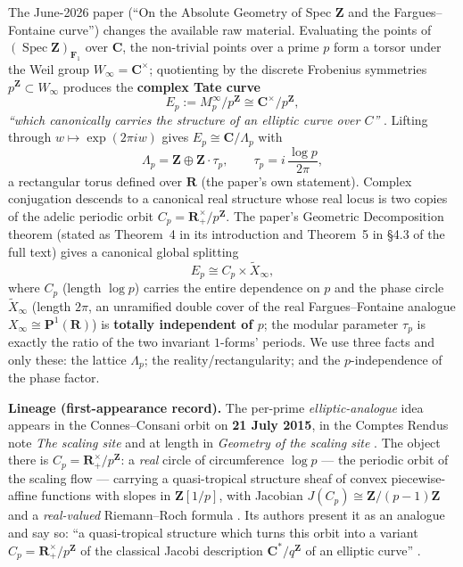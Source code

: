 \documentclass[11pt]{article}
\theoremstyle{definition}
\theoremstyle{remark}
\newcommand{\Z}{\mathbf{Z}}
\newcommand{\R}{\mathbf{R}}
\newcommand{\C}{\mathbf{C}}
\newcommand{\Fun}{\mathbf{F}_1}
\newcommand{\SpecZ}{\operatorname{Spec}\Z}
\begin{document}
The June-2026 paper \cite{CC26} (``On the Absolute Geometry of Spec $\Z$ and
the Fargues--Fontaine curve'') changes the available raw material. Evaluating
the points of $(\SpecZ)_{\Fun}$ over $\C$, the non-trivial points over a
prime $p$ form a torsor under the Weil group $W_\infty = \C^\times$;
quotienting by the discrete Frobenius symmetries $p^\Z \subset W_\infty$
produces the \textbf{complex Tate curve}
\[
E_p := M_p^\infty / p^\Z \cong \C^\times / p^\Z ,
\]
\emph{``which canonically carries the structure of an elliptic curve over
$C$''} \cite[eq.~(4) and \S4.1.2]{CC26}. Lifting through
$w \mapsto \exp(2\pi i w)$ gives $E_p \cong \C/\Lambda_p$ with
\[
\Lambda_p = \Z \oplus \Z\cdot\tau_p , \qquad \tau_p = i\,\frac{\log p}{2\pi} ,
\]
a rectangular torus defined over $\R$ (the paper's own statement). Complex
conjugation descends to a canonical real structure whose real locus is two
copies of the adelic periodic orbit $C_p = \R^\times_{+}/p^\Z$. The paper's
Geometric Decomposition theorem (stated as Theorem~4 in its introduction and
Theorem~5 in \S4.3 of the full text) gives a canonical global splitting
\[
E_p \cong C_p \times \widetilde{X}_\infty ,
\]
where $C_p$ (length $\log p$) carries the entire dependence on $p$ and the
phase circle $\widetilde{X}_\infty$ (length $2\pi$, an unramified double
cover of the real Fargues--Fontaine analogue $X_\infty \cong \mathbf{P}^1(\R)$)
is \textbf{totally independent of $p$}; the modular parameter $\tau_p$ is
exactly the ratio of the two invariant $1$-forms' periods. We use three facts
and only these: the lattice $\Lambda_p$; the reality/rectangularity; and the
$p$-independence of the phase factor.

\textbf{Lineage (first-appearance record).} The per-prime
\emph{elliptic-analogue} idea appears in the Connes--Consani orbit on
\textbf{21 July 2015}, in the Comptes Rendus note \emph{The scaling site}
\cite{CC16b} and at length in \emph{Geometry of the scaling site} \cite{CC17}.
The object there is $C_p = \R^\times_+/p^{\Z}$: a \emph{real} circle of
circumference $\log p$ --- the periodic orbit of the scaling flow --- carrying a
quasi-tropical structure sheaf of convex piecewise-affine functions with slopes
in $\Z[1/p]$, with Jacobian $J(C_p) \cong \Z/(p-1)\Z$ and a \emph{real-valued}
Riemann--Roch formula \cite[Lemma~6.3, Thm.~6.5, Thm.~6.7(ii)]{CC16b}. Its
authors present it as an analogue and say so: ``a quasi-tropical structure which
turns this orbit into a variant $C_p = \R^\times_+/p^{\Z}$ of the classical
Jacobi description $\C^*/q^{\Z}$ of an elliptic curve''
\cite[abstract]{CC17}.
\end{document}
